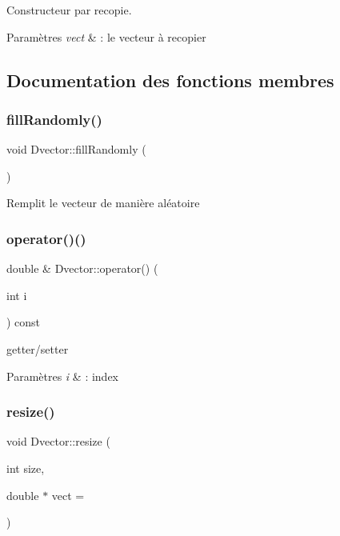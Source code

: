 Constructeur par recopie. 


\begin{DoxyParams}{Paramètres}
{\em vect} & \+: le vecteur à recopier \\
\hline
\end{DoxyParams}


\subsection{Documentation des fonctions membres}
\mbox{\label{class_dvector_a6fecdca0fbad7f928403597e322234b1}} 
\subsubsection{\texorpdfstring{fill\+Randomly()}{fillRandomly()}}
{\footnotesize\ttfamily void Dvector\+::fill\+Randomly (\begin{DoxyParamCaption}{ }\end{DoxyParamCaption})}

Remplit le vecteur de manière aléatoire \mbox{\label{class_dvector_a237ba8b1ca7e68f78ec3f85ae800cbec}} 
\subsubsection{\texorpdfstring{operator()()}{operator()()}}
{\footnotesize\ttfamily double \& Dvector\+::operator() (\begin{DoxyParamCaption}\item[{int}]{i }\end{DoxyParamCaption}) const}



getter/setter 


\begin{DoxyParams}{Paramètres}
{\em i} & \+: index \\
\hline
\end{DoxyParams}
\mbox{\label{class_dvector_a3df83649e0ed9cf7c21fe03fdef8b2f4}} 
\subsubsection{\texorpdfstring{resize()}{resize()}}
{\footnotesize\ttfamily void Dvector\+::resize (\begin{DoxyParamCaption}\item[{int}]{size,  }\item[{double $\ast$}]{vect = {} }\end{DoxyParamCaption})}



